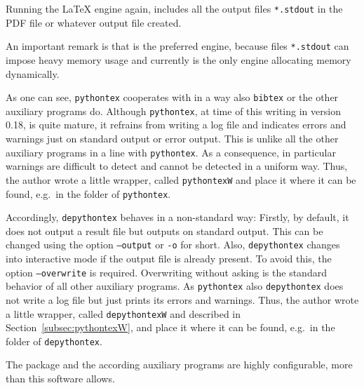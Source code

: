 
Running the \LaTeX{} engine again, 
includes all the output files \texttt{*.stdout} 
in the PDF file or whatever output file created. 


An important remark is that \lualatex{} is the preferred engine, 
because files \texttt{*.stdout} can impose heavy memory usage 
and currently \lualatex{} is the only engine allocating memory dynamically. 

As one can see, \texttt{pythontex} cooperates with \lualatex{} in a way 
also \texttt{bibtex} or the other auxiliary programs do. 
Although \texttt{pythontex}, at time of this writing in version 0.18, 
is quite mature, it refrains from writing a log file and indicates errors and warnings 
just on standard output or error output. 
This is unlike all the other auxiliary programs in a line with \texttt{pythontex}. 
As a consequence, in particular warnings are difficult to detect 
and cannot be detected in a uniform way. 
Thus, the author wrote a little wrapper, called \texttt{pythontexW} 
and place it where it can be found, e.g.~in the folder of \texttt{pythontex}. 

Accordingly, \texttt{depythontex} behaves in a non-standard way: 
Firstly, by default, it does not output a result file but outputs on standard output. 
This can be changed using the option \texttt{--output} or \texttt{-o} for short. 
Also, \texttt{depythontex} changes into interactive mode 
if the output file is already present. 
To avoid this, the option \texttt{--overwrite} is required. 
Overwriting without asking is the standard behavior of all other auxiliary programs. 
As \texttt{pythontex} also \texttt{depythontex} does not write a log file 
but just prints its errors and warnings. 
Thus, the author wrote a little wrapper, 
called \texttt{depythontexW} and described in Section~\ref{subsec:pythontexW}, 
and place it where it can be found, e.g.~in the folder of \texttt{depythontex}. 
\medskip


The package  and the according auxiliary programs are highly configurable, 
more than this software allows. 

